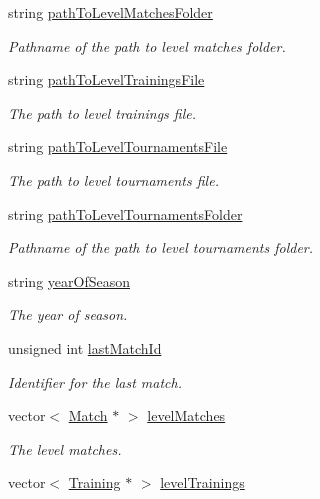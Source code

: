 \begin{DoxyCompactItemize}
string \hyperlink{class_level_aa13c0c2c38b5cb67f5aa51654710d9a7}{path\+To\+Level\+Matches\+Folder}
\begin{DoxyCompactList}\small\item\em Pathname of the path to level matches folder. \end{DoxyCompactList}\item 
string \hyperlink{class_level_a3958021df480857263d65f57c668f5bd}{path\+To\+Level\+Trainings\+File}
\begin{DoxyCompactList}\small\item\em The path to level trainings file. \end{DoxyCompactList}\item 
string \hyperlink{class_level_a1c196300430057e2d7d133e85f0c929a}{path\+To\+Level\+Tournaments\+File}
\begin{DoxyCompactList}\small\item\em The path to level tournaments file. \end{DoxyCompactList}\item 
string \hyperlink{class_level_a49f20ede8543a270f763f7253c4247d6}{path\+To\+Level\+Tournaments\+Folder}
\begin{DoxyCompactList}\small\item\em Pathname of the path to level tournaments folder. \end{DoxyCompactList}\item 
string \hyperlink{class_level_a39e8e8b8d5f64c3d3a50b617c3ea8321}{year\+Of\+Season}
\begin{DoxyCompactList}\small\item\em The year of season. \end{DoxyCompactList}\item 
unsigned int \hyperlink{class_level_a4c6c8eb32ad6dbc8b7dae820de6db4ba}{last\+Match\+Id}
\begin{DoxyCompactList}\small\item\em Identifier for the last match. \end{DoxyCompactList}\item 
vector$<$ \hyperlink{class_match}{Match} $\ast$ $>$ \hyperlink{class_level_ace54062d1ad170581337f33ac4d6ab45}{level\+Matches}
\begin{DoxyCompactList}\small\item\em The level matches. \end{DoxyCompactList}\item 
vector$<$ \hyperlink{class_training}{Training} $\ast$ $>$ \hyperlink{class_level_a887624d3374e9ba74edfeb6a5a38a4b1}{level\+Trainings}

\end{DoxyCompactItemize}
